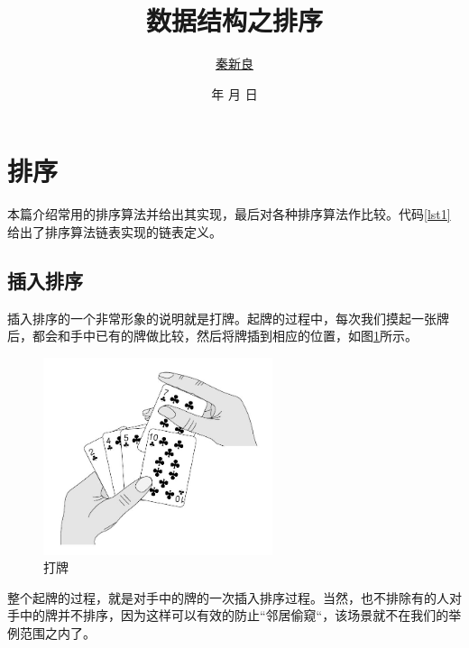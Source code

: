 \documentclass[a4paper, 12pt, titlepage]{article}
\newcommand*{\TitleFont}{\usefont{\encodingdefault}{\rmdefault}{b}{n}\fontsize{32}{40}\selectfont\CJKfamily{title}\color{seco}}%
\renewcommand{\today}{\color{seco}\number\year 年 \number\month 月 \number\day 日}
\begin{document}
\setlength{\parindent}{2em}

\title{\TitleFont 数据结构之排序\vspace{8cm}}
\author{\href{mailto:q00148943@gmail.com}{\LARGE{秦新良}}}
\date{\vspace{0.5cm}\today}

\maketitle

\tableofcontents
\newpage


\section{排序}
本篇介绍常用的排序算法并给出其实现，最后对各种排序算法作比较。代码\ref{lst1}给出了排序算法链表实现的链表定义。
\begin{spacing}{1.0}
  
\end{spacing}

\subsection{插入排序}
\label{subsec:labelsub1}
插入排序的一个非常形象的说明就是打牌。起牌的过程中，每次我们摸起一张牌后，都会和手中已有的牌做比较，然后将牌插到相应的位置，如图\ref{fig00}所示。
\begin{figure}[H]
  \setlength{\abovecaptionskip}{0pt}
  \centering
  \includegraphics[width=0.6\textwidth]{playing_cards.jpg}
  \caption{打牌}
  \label{fig00}
\end{figure}


整个起牌的过程，就是对手中的牌的一次插入排序过程。当然，也不排除有的人对手中的牌并不排序，因为这样可以有效的防止“邻居偷窥“，该场景就不在我们的举例范围之内了。
\end{document}
